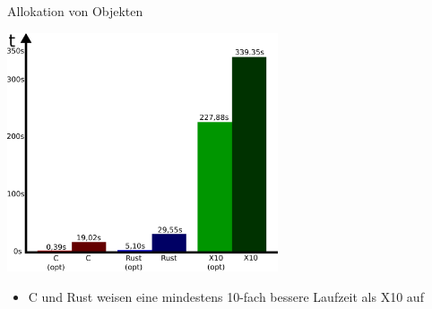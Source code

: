 \begin{frame}{Allokation von Objekten}
  \begin{center}
    \includegraphics[width=0.6\textwidth]{images/garbage-eval.pdf}
  \end{center}
  \begin{itemize}
    \item C und Rust weisen eine mindestens 10-fach bessere Laufzeit als X10 auf
  \end{itemize}
\end{frame}